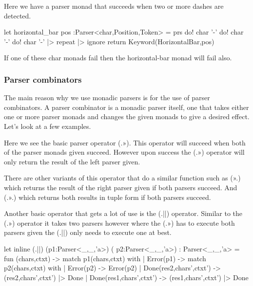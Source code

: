 Here we have a parser monad that succeeds when two or more dashes are detected.

\begin{code}
	let horizontal_bar pos :Parser<char,Position,Token> = 
		prs{ 
			do! char '-' 
			do! char '-' 
			do! char '-' |> repeat |> ignore 
			return Keyword(HorizontalBar,pos) 
		}
\end{code}

If one of these char monads fail then the horizontal-bar monad will fail also. 

\subsubsection{Parser combinators}

The main reason why we use monadic parsers is for the use of parser combinators. A parser combinator is a monadic parser itself, one that takes either one or more parser monads and changes the given monads to give a desired effect. Let’s look at a few examples. 

Here we see the basic parser operator (.»). This operator will succeed when both of the parser monads given succeed. However upon success the (.») operator will only return the result of the left parser given. 

\begin{code}
	let (.>>) (l) (r) = 
		prs{ 
			let! res = P1 
			do! P2 
			return res 
		} 
	} 
	char ‘(’a) .>> char ‘(’b)
\end{code}

There are other variants of this operator that do a similar function such as (».) which returns the result of the right parser given if both parsers succeed. And (.».) which returns both results in tuple form if both parsers succeed. 

Another basic operator that gets a lot of use is the (.||) operator. Similar to the (.») operator it takes two parsers however where the (.») has to execute both parsers given the (.||) only needs to execute one at best.

\begin{code}
	let inline (.||) (p1:Parser<_,_,'a>) ( p2:Parser<_,_,'a>) : Parser<_,_,'a> = 
		fun (chars,ctxt) -> 
		match p1(chars,ctxt) with 
		| Error(p1) -> 
			match p2(chars,ctxt) with 
			| Error(p2) -> Error(p2) 
			| Done(res2,chars',ctxt') -> (res2,chars',ctxt') |> Done 
		| Done(res1,chars',ctxt') -> (res1,chars',ctxt') |> Done
\end{code}

